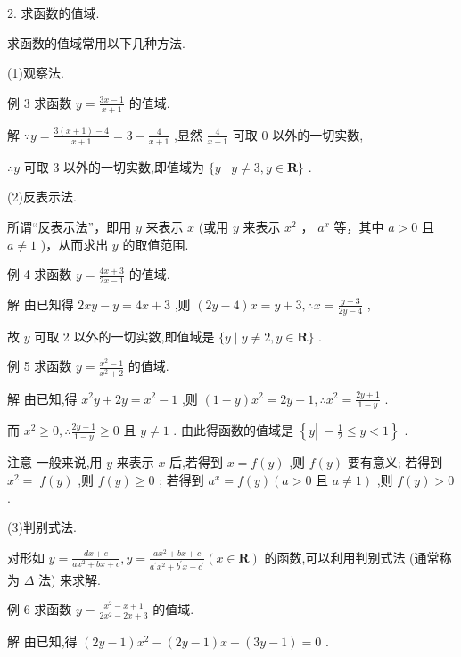 \documentclass[10pt]{article}
\begin{document}
2. 求函数的值域.

求函数的值域常用以下几种方法.

(1)观察法.

例 3 求函数 \(y = \frac{{3x} - 1}{x + 1}\) 的值域.

解 \(\because y = \frac{3\left( {x + 1}\right)  - 4}{x + 1} = 3 - \frac{4}{x + 1}\) ,显然 \(\frac{4}{x + 1}\) 可取 0 以外的一切实数,

\(\therefore y\) 可取 3 以外的一切实数,即值域为 \(\{ y \mid  y \neq  3,y \in  \mathbf{R}\}\) .

(2)反表示法.

所谓“反表示法”，即用 \(y\) 来表示 \(x\) (或用 \(y\) 来表示 \({x}^{2}\) ， \({a}^{x}\) 等，其中 \(a > 0\) 且 \(a \neq  1\) )，从而求出 \(y\) 的取值范围.

例 4 求函数 \(y = \frac{{4x} + 3}{{2x} - 1}\) 的值域.

解 由已知得 \({2xy} - y = {4x} + 3\) ,则 \(\left( {{2y} - 4}\right) x = y + 3,\therefore x = \frac{y + 3}{{2y} - 4}\) ,

故 \(y\) 可取 2 以外的一切实数,即值域是 \(\{ y \mid  y \neq  2,y \in  \mathbf{R}\}\) .

例 5 求函数 \(y = \frac{{x}^{2} - 1}{{x}^{2} + 2}\) 的值域.

解 由已知,得 \({x}^{2}y + {2y} = {x}^{2} - 1\) ,则 \(\left( {1 - y}\right) {x}^{2} = {2y} + 1,\therefore {x}^{2} = \frac{{2y} + 1}{1 - y}\) .

而 \({x}^{2} \geq  0,\therefore \frac{{2y} + 1}{1 - y} \geq  0\) 且 \(y \neq  1\) . 由此得函数的值域是 \(\left\{  {y\left| {\; - \frac{1}{2} \leq  y < 1}\right. }\right\}\) .

注意 一般来说,用 \(y\) 来表示 \(x\) 后,若得到 \(x = f\left( y\right)\) ,则 \(f\left( y\right)\) 要有意义; 若得到 \({x}^{2} = \; f\left( y\right)\) ,则 \(f\left( y\right)  \geq  0\) ; 若得到 \({a}^{x} = f\left( y\right) \left( {a > 0\text{ 且 }a \neq  1}\right)\) ,则 \(f\left( y\right)  > 0\) .

(3)判别式法.

对形如 \(y = \frac{{dx} + e}{a{x}^{2} + {bx} + c},y = \frac{a{x}^{2} + {bx} + c}{{a}^{\prime }{x}^{2} + {b}^{\prime }x + {c}^{\prime }}\left( {x \in  \mathbf{R}}\right)\) 的函数,可以利用判别式法 (通常称为 \(\Delta\) 法) 来求解.

例 6 求函数 \(y = \frac{{x}^{2} - x + 1}{2{x}^{2} - {2x} + 3}\) 的值域.

解 由已知,得 \(\left( {{2y} - 1}\right) {x}^{2} - \left( {{2y} - 1}\right) x + \left( {{3y} - 1}\right)  = 0\) .
\end{document}
